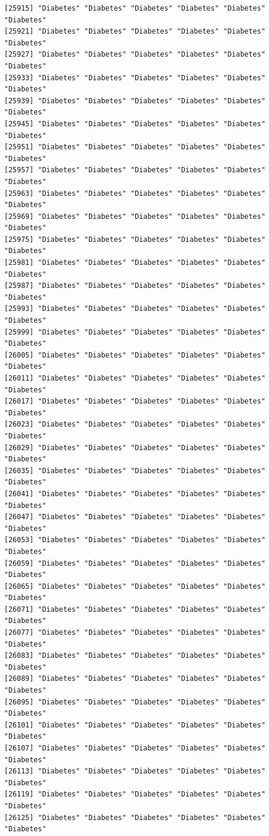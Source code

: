 \documentclass[
  letterpaper,
  DIV=11,
  numbers=noendperiod]{scrartcl}
\begin{document}
\begin{verbatim}
[25915] "Diabetes" "Diabetes" "Diabetes" "Diabetes" "Diabetes" "Diabetes"
[25921] "Diabetes" "Diabetes" "Diabetes" "Diabetes" "Diabetes" "Diabetes"
[25927] "Diabetes" "Diabetes" "Diabetes" "Diabetes" "Diabetes" "Diabetes"
[25933] "Diabetes" "Diabetes" "Diabetes" "Diabetes" "Diabetes" "Diabetes"
[25939] "Diabetes" "Diabetes" "Diabetes" "Diabetes" "Diabetes" "Diabetes"
[25945] "Diabetes" "Diabetes" "Diabetes" "Diabetes" "Diabetes" "Diabetes"
[25951] "Diabetes" "Diabetes" "Diabetes" "Diabetes" "Diabetes" "Diabetes"
[25957] "Diabetes" "Diabetes" "Diabetes" "Diabetes" "Diabetes" "Diabetes"
[25963] "Diabetes" "Diabetes" "Diabetes" "Diabetes" "Diabetes" "Diabetes"
[25969] "Diabetes" "Diabetes" "Diabetes" "Diabetes" "Diabetes" "Diabetes"
[25975] "Diabetes" "Diabetes" "Diabetes" "Diabetes" "Diabetes" "Diabetes"
[25981] "Diabetes" "Diabetes" "Diabetes" "Diabetes" "Diabetes" "Diabetes"
[25987] "Diabetes" "Diabetes" "Diabetes" "Diabetes" "Diabetes" "Diabetes"
[25993] "Diabetes" "Diabetes" "Diabetes" "Diabetes" "Diabetes" "Diabetes"
[25999] "Diabetes" "Diabetes" "Diabetes" "Diabetes" "Diabetes" "Diabetes"
[26005] "Diabetes" "Diabetes" "Diabetes" "Diabetes" "Diabetes" "Diabetes"
[26011] "Diabetes" "Diabetes" "Diabetes" "Diabetes" "Diabetes" "Diabetes"
[26017] "Diabetes" "Diabetes" "Diabetes" "Diabetes" "Diabetes" "Diabetes"
[26023] "Diabetes" "Diabetes" "Diabetes" "Diabetes" "Diabetes" "Diabetes"
[26029] "Diabetes" "Diabetes" "Diabetes" "Diabetes" "Diabetes" "Diabetes"
[26035] "Diabetes" "Diabetes" "Diabetes" "Diabetes" "Diabetes" "Diabetes"
[26041] "Diabetes" "Diabetes" "Diabetes" "Diabetes" "Diabetes" "Diabetes"
[26047] "Diabetes" "Diabetes" "Diabetes" "Diabetes" "Diabetes" "Diabetes"
[26053] "Diabetes" "Diabetes" "Diabetes" "Diabetes" "Diabetes" "Diabetes"
[26059] "Diabetes" "Diabetes" "Diabetes" "Diabetes" "Diabetes" "Diabetes"
[26065] "Diabetes" "Diabetes" "Diabetes" "Diabetes" "Diabetes" "Diabetes"
[26071] "Diabetes" "Diabetes" "Diabetes" "Diabetes" "Diabetes" "Diabetes"
[26077] "Diabetes" "Diabetes" "Diabetes" "Diabetes" "Diabetes" "Diabetes"
[26083] "Diabetes" "Diabetes" "Diabetes" "Diabetes" "Diabetes" "Diabetes"
[26089] "Diabetes" "Diabetes" "Diabetes" "Diabetes" "Diabetes" "Diabetes"
[26095] "Diabetes" "Diabetes" "Diabetes" "Diabetes" "Diabetes" "Diabetes"
[26101] "Diabetes" "Diabetes" "Diabetes" "Diabetes" "Diabetes" "Diabetes"
[26107] "Diabetes" "Diabetes" "Diabetes" "Diabetes" "Diabetes" "Diabetes"
[26113] "Diabetes" "Diabetes" "Diabetes" "Diabetes" "Diabetes" "Diabetes"
[26119] "Diabetes" "Diabetes" "Diabetes" "Diabetes" "Diabetes" "Diabetes"
[26125] "Diabetes" "Diabetes" "Diabetes" "Diabetes" "Diabetes" "Diabetes"

\end{verbatim}
\end{document}
